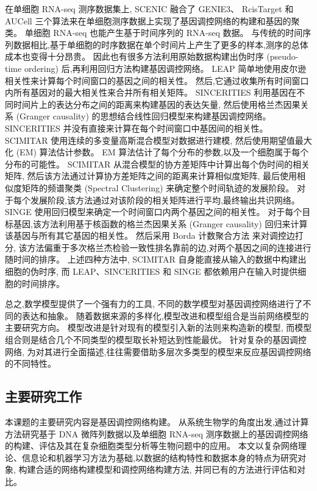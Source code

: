 在单细胞 RNA-seq 测序数据集上, 
SCENIC  融合了 GENIE3、 RcisTarget 和 AUCell 三个算法来在单细胞测序数据上实现了基因调控网络的构建和基因的聚类。
单细胞 RNA-seq 也能产生基于时间序列的 RNA-seq 数据。
与传统的时间序列数据相比,基于单细胞的时序数据在单个时间片上产生了更多的样本,测序的总体成本也变得十分昂贵。
因此也有很多方法利用原始数据构建出伪时序 (pseudo-time ordering) 后,再利用回归方法构建基因调控网络。
LEAP  简单地使用皮尔逊相关性来计算每个时间窗口的基因之间的相关性。 
然后,它通过收集所有时间窗口内所有基因对的最大相关性来合并所有相关矩阵。
SINCERITIES  利用基因在不同时间片上的表达分布之间的距离来构建基因的表达矢量,
然后使用格兰杰因果关系 (Granger causality) 的思想结合线性回归模型来构建基因调控网络。
SINCERITIES 并没有直接来计算在每个时间窗口中基因间的相关性。
SCIMITAR  使用连续的多变量高斯混合模型对数据进行建模,
然后使用期望值最大化 (EM) 算法估计参数。
EM 算法估计了每个分布的参数,以及一个细胞属于每个分布的可能性。
SCIMITAR 从混合模型的协方差矩阵中计算出每个伪时间的相关矩阵,
然后该方法通过计算协方差矩阵之间的距离来计算相似度矩阵,
最后使用相似度矩阵的频谱聚类 (Spectral Clustering) 来确定整个时间轨迹的发展阶段。
对于每个发展阶段,该方法通过对该阶段的相关矩阵进行平均,最终输出共识网络。
SINGE  使用回归模型来确定一个时间窗口内两个基因之间的相关性。
对于每个目标基因,该方法利用基于核函数的格兰杰因果关系 (Granger causality) 回归来计算该基因与所有其它基因的相关性。
然后采用 Borda 计数聚合方法  来对调控边打分,
该方法偏重于多次格兰杰检验一致性排名靠前的边,对两个基因之间的连接进行随时间的排序。
上述四种方法中, SCIMITAR 自身能直接从输入的数据中构建出细胞的伪时序, 
而 LEAP、SINCERITIES 和 SINGE 都依赖用户在输入时提供细胞的时间排序。


总之,数学模型提供了一个强有力的工具,
不同的数学模型对基因调控网络进行了不同的表达和抽象。
随着数据来源的多样化,模型改进和模型组合是当前网络模型的主要研究方向。
模型改进是针对现有的模型引入新的法则来构造新的模型,
而模型组合则是结合几个不同类型的模型取长补短达到性能最优。
针对复杂的基因调控网络,
为对其进行全面描述,往往需要借助多层次多类型的模型来反应基因调控网络的不同特性。

\subsection{主要研究工作}
本课题的主要研究内容是基因调控网络构建。
从系统生物学的角度出发,通过计算方法研究基于 DNA 微阵列数据以及单细胞 RNA-seq 测序数据上的基因调控网络的构建、评估及其在复杂细胞类型分析等生物问题中的应用。
本文以复杂网络理论、信息论和机器学习方法为基础,以数据的结构特性和数据本身的特点为研究对象,
构建合适的网络构建模型和调控网络构建方法,
并同已有的方法进行评估和对比。

